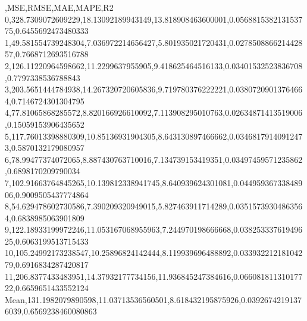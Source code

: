 ,MSE,RMSE,MAE,MAPE,R2
0,328.7309072609229,18.13092189943149,13.818908463600001,0.056881538213153775,0.6455692473480333
1,49.581554739248304,7.036972214656427,5.801935021720431,0.027850886621442857,0.7668712693516788
2,126.11220964598662,11.2299637955905,9.418625464516133,0.03401532523836708,0.7797338536788843
3,203.5651444784938,14.267320720605836,9.719780376222221,0.03807209013764664,0.7146724301304795
4,77.81065868285572,8.820166926610092,7.113908295010763,0.02634871413519006,0.15059153906435652
5,117.76013398880309,10.85136931904305,8.643130897466662,0.03468179140912473,0.5870132179080957
6,78.99477374072065,8.887430763710016,7.134739153419351,0.03497459571235862,0.6898170209790034
7,102.91663764845265,10.139812338941745,8.640939624301081,0.04495936733848906,0.9009505437774864
8,54.629478602730586,7.390209320949015,5.827463911714289,0.03515739304863564,0.6838985063901809
9,122.18933199972246,11.053167068955963,7.244970198666668,0.03825333761949625,0.6063199513715433
10,105.24992173238547,10.25896824142444,8.119939696488892,0.03393221218104279,0.6916834287420817
11,206.8377433483951,14.37932177734156,11.936845247384616,0.06608181131017722,0.6659651433552124
Mean,131.1982079890598,11.03713536560501,8.618432195875926,0.03926742191376039,0.6569238460080863
